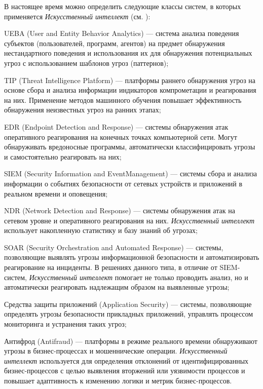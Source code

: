 В настоящее время можно определить следующие классы систем, в которых применяется \textit{Искусственный интеллект} (см. ):

\begin{textitemize}
	\item UEBA (User and Entity Behavior Analytics) --- система анализа поведения субъектов (пользователей, программ, агентов) на предмет обнаружения нестандартного поведения и использования их для обнаружения потенциальных угроз с использованием шаблонов угроз (паттернов);
	\item TIP (Threat Intelligence Platform) --- платформы раннего обнаружения угроз на основе сбора и анализа информации индикаторов компрометации и реагирования на них. Применение методов машинного обучения повышает эффективность обнаружения неизвестных угроз на ранних этапах;
	\item EDR (Endpoint Detection and Response) --- системы обнаружения атак оперативного реагирования на конечных точках компьютерной сети. Могут обнаруживать вредоносные программы, автоматически классифицировать угрозы и самостоятельно реагировать на них;
	\item SIEM (Security Information and EventManagement) --- системы сбора и анализа информации о событиях безопасности от сетевых устройств и приложений в реальном времени и оповещения;
	\item NDR (Network Detection and Response) --- системы обнаружения атак на сетевом уровне и оперативного реагирования на них. \textit{Искусственный интеллект} использует накопленную статистику и базу знаний об угрозах;
	\item SOAR (Security Orchestration and Automated Response) --- системы, позволяющие выявлять угрозы информационной безопасности и автоматизировать реагирование на инциденты. В решениях данного типа, в отличие от SIEM-систем, \textit{Искусственный интеллект} помогает не только проводить анализ, но и автоматически реагировать надлежащим образом на выявленные угрозы;
	\item Средства защиты приложений (Application Security) --- системы, позволяющие определять угрозы безопасности прикладных приложений, управлять процессом мониторинга и устранения таких угроз;
	\item Антифрод (Antifraud) --- платформы в режиме реального времени обнаруживают угрозы в бизнес-процессах и мошеннические операции. \textit{Искусственный интеллект} используется для определения отклонений от идентифицированных бизнес-процессов с целью выявления вторжений или уязвимости процессов и повышает адаптивность к изменению логики и метрик бизнес-процессов.
\end{textitemize}


